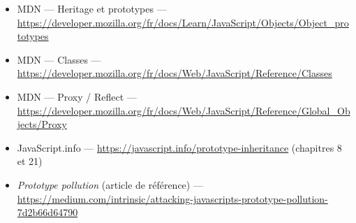 \begin{ressources}
\begin{itemize}
  \item MDN --- Heritage et prototypes --- \url{https://developer.mozilla.org/fr/docs/Learn/JavaScript/Objects/Object_prototypes}
  \item MDN --- Classes --- \url{https://developer.mozilla.org/fr/docs/Web/JavaScript/Reference/Classes}
  \item MDN --- Proxy / Reflect --- \url{https://developer.mozilla.org/fr/docs/Web/JavaScript/Reference/Global_Objects/Proxy}
  \item JavaScript.info --- \url{https://javascript.info/prototype-inheritance} (chapitres 8 et 21)
  \item \emph{Prototype pollution} (article de r\'ef\'erence) --- \url{https://medium.com/intrinsic/attacking-javascripts-prototype-pollution-7d2b66d64790}
\end{itemize}
\end{ressources}

